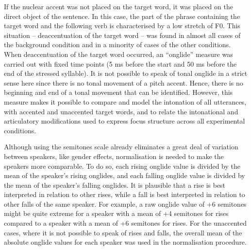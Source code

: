 If the nuclear accent was not placed on the target word, it was placed on the direct object of the sentence. In this case, the part of the phrase containing the target word and the following verb is characterised by a low stretch of F0. This situation -- deaccentuation of the target word -- was found in almost all cases of the background condition and in a minority of cases of the other conditions. When deaccentuation of the target word occurred, an ``onglide” measure was carried out with fixed time points (5 ms before the start and 50 ms before the end of the stressed syllable). It is not possible to speak of tonal onglide in a strict sense here since there is no tonal movement of a pitch accent. Hence, there is no beginning and end of a tonal movement that can be identified. However, this measure makes it possible to compare and model the intonation of all utterances, with accented and unaccented target words, and to relate the intonational and articulatory modifications used to express focus structure across all experimental conditions.

Although using the semitones scale already eliminates a great deal of variation between speakers, like gender effects, normalisation is needed to make the speakers more comparable. To do so, each rising onglide value is divided by the mean of the speaker’s rising onglides, and each falling onglide value is divided by the mean of the speaker’s falling onglides. It is plausible that a rise is best interpreted in relation to other rises, while a fall is best interpreted in relation to other falls of the same speaker. For example, a raw onglide value of +6 semitones might be quite extreme for a speaker with a mean of +4 semitones for rises compared to a speaker with a mean of +6 semitones for rises. For the unaccented cases, where it is not possible to speak of rises and falls, the overall mean of the absolute onglide values for each speaker was used in the normalisation procedure.

